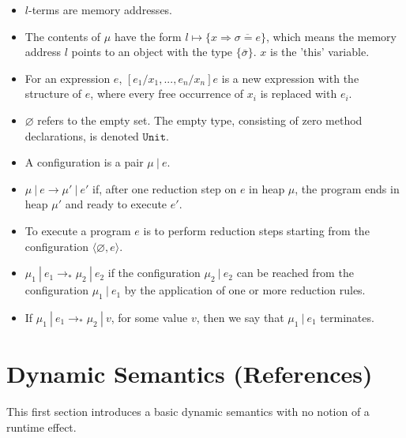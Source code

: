 \documentclass{llncs}
\newcommand{\keywadj}[1]{\mathtt{#1}}
\newcommand{\config}[1] { \langle #1 \rangle }
\begin{document}
\begin{itemize}
	\item $l$-terms are memory addresses.
	\item The contents of $\mu$ have the form $l \mapsto \{ x \Rightarrow \overline{\sigma = e}\}$, which means the memory address $l$ points to an object with the type $\{ \bar \sigma \}$. $x$ is the 'this' variable.
	\item For an expression $e$, $[e_1/x_1, ..., e_n/x_n]e$ is a new expression with the structure of $e$, where every free occurrence of $x_i$ is replaced with $e_i$.
	\item $\varnothing$ refers to the empty set. The empty type, consisting of zero method declarations, is denoted $\keywadj{Unit}$.
	\item A configuration is a pair $\mu~|~ e$.
	\item $\mu~|~e \longrightarrow \mu'~|~e'$ if, after one reduction step on $e$ in heap $\mu$, the program ends in heap $\mu'$ and ready to execute $e'$.
	\item To execute a program $e$ is to perform reduction steps starting from the configuration $\config{\varnothing, e}$.
	\item $\mu_1~|~e_1 \longrightarrow_* \mu_2~|~e_2$ if the configuration $\mu_2~|~e_2$ can be reached from the configuration $\mu_1~|~e_1$ by the application of one or more reduction rules.
	\item If $\mu_1~|~e_1 \longrightarrow_* \mu_2~|~v$, for some value $v$, then we say that $\mu_1~|~e_1$ terminates.
\end{itemize}

\newpage

\section{Dynamic Semantics (References)}

This first section introduces a basic dynamic semantics with no notion of a runtime effect.
\\

\end{document}
